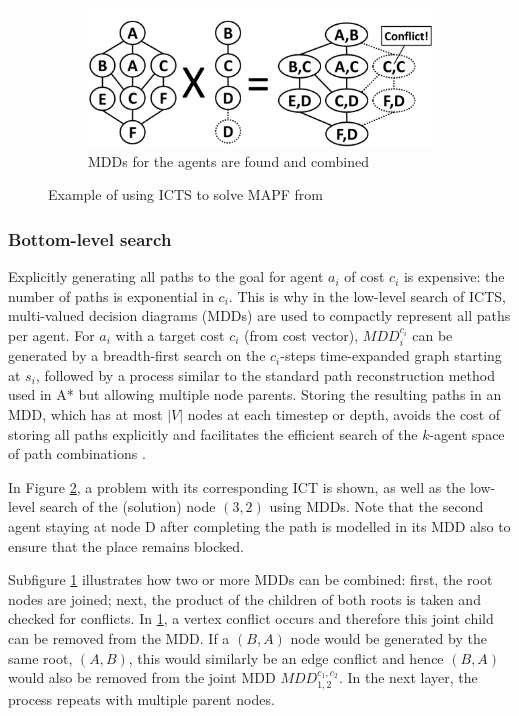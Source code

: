 \documentclass[english,10pt]{article}
\begin{document}
\begin{figure}[b]
		\begin{subfigure}{0.4\textwidth}
			\centering
			\includegraphics[width=\linewidth]{img/mdds}
			\caption{MDDs for the agents are found and combined}
			\label{fig:mdds}
		\end{subfigure}
		
		\caption{Example of using ICTS to solve MAPF from \cite{sharon2011}}
		\label{fig:bottom}
	\end{figure}
	\subsubsection{Bottom-level search}
	Explicitly generating all paths to the goal for agent $a_i$ of cost $c_i$ is expensive: the number of paths is exponential in $c_i$. This is why in the low-level search of ICTS, multi-valued decision diagrams (MDDs) are used to compactly represent all paths per agent. For $a_i$ with a target cost $c_i$ (from cost vector), $MDD_i^{c_i}$ can be generated by a breadth-first search on the $c_i$-steps time-expanded graph starting at $s_i$, followed by a process similar to the standard path reconstruction method used in A* but allowing multiple node parents. Storing the resulting paths in an MDD, which has at most $|V|$ nodes at each timestep or depth, avoids the cost of storing all paths explicitly and facilitates the efficient search of the $k$-agent space of path combinations \cite{sharon2011}.
	
	In Figure \ref{fig:bottom}, a problem with its corresponding ICT is shown, as well as the low-level search of the (solution) node $(3,2)$ using MDDs. Note that the second agent staying at node D after completing the path is modelled in its MDD also to ensure that the place remains blocked.
	
	Subfigure \ref{fig:mdds} illustrates how two or more MDDs can be combined: first, the root nodes are joined; next, the product of the children of both roots is taken and checked for conflicts. In \ref{fig:mdds}, a vertex conflict occurs and therefore this joint child can be removed from the MDD. If a $(B,A)$ node would be generated by the same root, $(A,B)$, this would similarly be an edge conflict and hence $(B,A)$ would also be removed from the joint MDD $MDD_{1,2}^{c_1,c_2}$. In the next layer, the process repeats with multiple parent nodes.
	
\end{document}
